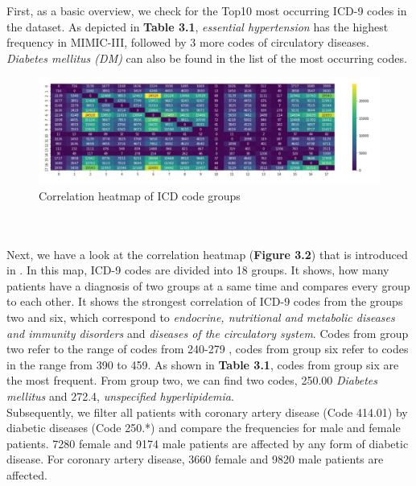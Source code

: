 \documentclass[11pt, a4paper]{book}
\begin{document}
First, as a basic overview, we check for the Top10 most occurring ICD-9 codes in the dataset. As depicted in \textbf{Table 3.1}, \textit{essential hypertension} has the highest frequency in MIMIC-III, followed by 3 more codes of circulatory diseases. \textit{Diabetes mellitus (DM)} can also be found in the list of the most occurring codes.

\begin{figure}
  \begin{center}
  \includegraphics[width=1\textwidth]{img/correlation-heatmap.png}
  \caption{Correlation heatmap of ICD code groups \cite{arya2019exploratory}}
  \label{fig:correlation-heatmap}
  \end{center}
\end{figure}


\\
\\
Next, we have a look at the correlation heatmap (\textbf{Figure 3.2}) that is introduced in \cite{arya2019exploratory}. In this map, ICD-9 codes are divided into 18 groups. It shows, how many patients have a diagnosis of two groups at a same time and compares every group to each other. It shows the strongest correlation of ICD-9 codes from the groups two and six, which correspond to \textit{endocrine, nutritional and metabolic diseases and immunity disorders} and \textit{diseases of the circulatory system}. Codes from group two refer to the range of codes from 240-279 , codes from group six refer to codes in the range from 390 to 459. As shown in \textbf{Table 3.1}, codes from group six are the most frequent. From group two, we can find two codes, 250.00 \textit{Diabetes mellitus} and 272.4, \textit{unspecified hyperlipidemia}.
\\

Subsequently, we filter all patients with coronary artery disease (Code 414.01) by diabetic diseases (Code 250.*) and compare the frequencies for male and female patients. 7280 female and 9174 male patients are affected by any form of diabetic disease.
For coronary artery disease, 3660 female and 9820 male patients are affected. 
\end{document}
